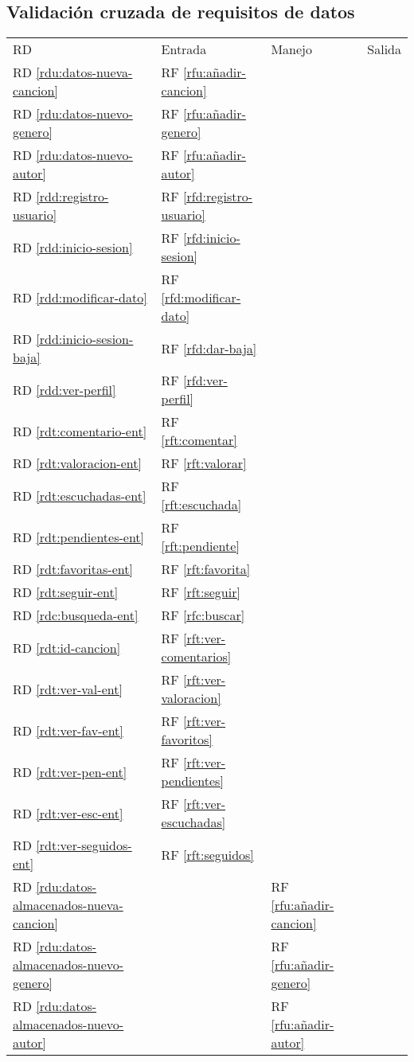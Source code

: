 \documentclass[
  12pt,
  a4paper,
  DIV=12,
  spanish,
]{scrartcl}
\newcounter{RF}
\newcounter{RD}
\begin{document}
\subsection{Validación cruzada de requisitos de datos}
\keepXColumns
\begin{tabularx}{\linewidth}{l|XXX}
  RD & Entrada & Manejo & Salida \\
  RD \ref{rdu:datos-nueva-cancion} & RF \ref{rfu:añadir-cancion} & & \\
  RD \ref{rdu:datos-nuevo-genero} & RF \ref{rfu:añadir-genero} & & \\
  RD \ref{rdu:datos-nuevo-autor} & RF \ref{rfu:añadir-autor} \\
  RD \ref{rdd:registro-usuario} & RF \ref{rfd:registro-usuario} & & \\
  RD \ref{rdd:inicio-sesion} & RF \ref{rfd:inicio-sesion} & & \\
  RD \ref{rdd:modificar-dato} & RF \ref{rfd:modificar-dato} & & \\
  RD \ref{rdd:inicio-sesion-baja} & RF \ref{rfd:dar-baja} & & \\
  RD \ref{rdd:ver-perfil} & RF \ref{rfd:ver-perfil} & & \\
  RD \ref{rdt:comentario-ent} & RF \ref{rft:comentar} & & \\
  RD \ref{rdt:valoracion-ent} & RF \ref{rft:valorar} & & \\
  RD \ref{rdt:escuchadas-ent} & RF \ref{rft:escuchada} & & \\
  RD \ref{rdt:pendientes-ent} & RF \ref{rft:pendiente} & & \\
  RD \ref{rdt:favoritas-ent} & RF \ref{rft:favorita} & & \\
  RD \ref{rdt:seguir-ent} & RF \ref{rft:seguir} & & \\
  RD \ref{rdc:busqueda-ent} & RF \ref{rfc:buscar} & & \\
  RD \ref{rdt:id-cancion}  & RF \ref{rft:ver-comentarios} & & \\
  RD \ref{rdt:ver-val-ent} & RF \ref{rft:ver-valoracion} & & \\
  RD \ref{rdt:ver-fav-ent} & RF \ref{rft:ver-favoritos} & & \\
  RD \ref{rdt:ver-pen-ent} & RF \ref{rft:ver-pendientes} & & \\
  RD \ref{rdt:ver-esc-ent} & RF \ref{rft:ver-escuchadas} & & \\
  RD \ref{rdt:ver-seguidos-ent} & RF \ref{rft:seguidos} & & \\
  RD \ref{rdu:datos-almacenados-nueva-cancion} & & RF \ref{rfu:añadir-cancion} & \\
  RD \ref{rdu:datos-almacenados-nuevo-genero} & & RF \ref{rfu:añadir-genero} & \\
  RD \ref{rdu:datos-almacenados-nuevo-autor} & & RF \ref{rfu:añadir-autor} & \\


\end{tabularx}
\end{document}
